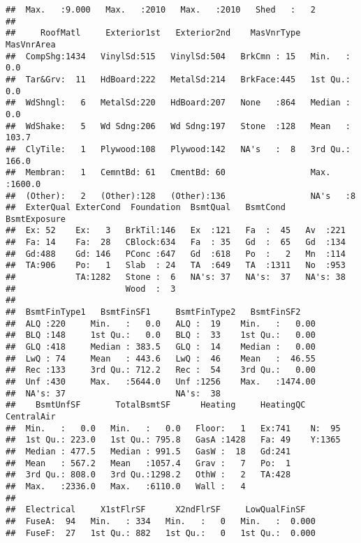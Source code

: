 \documentclass[]{article}
\begin{document}
\begin{verbatim}
##  Max.   :9.000   Max.   :2010   Max.   :2010   Shed   :   2  
##                                                              
##     RoofMatl     Exterior1st   Exterior2nd    MasVnrType    MasVnrArea    
##  CompShg:1434   VinylSd:515   VinylSd:504   BrkCmn : 15   Min.   :   0.0  
##  Tar&Grv:  11   HdBoard:222   MetalSd:214   BrkFace:445   1st Qu.:   0.0  
##  WdShngl:   6   MetalSd:220   HdBoard:207   None   :864   Median :   0.0  
##  WdShake:   5   Wd Sdng:206   Wd Sdng:197   Stone  :128   Mean   : 103.7  
##  ClyTile:   1   Plywood:108   Plywood:142   NA's   :  8   3rd Qu.: 166.0  
##  Membran:   1   CemntBd: 61   CmentBd: 60                 Max.   :1600.0  
##  (Other):   2   (Other):128   (Other):136                 NA's   :8       
##  ExterQual ExterCond  Foundation  BsmtQual   BsmtCond    BsmtExposure
##  Ex: 52    Ex:   3   BrkTil:146   Ex  :121   Fa  :  45   Av  :221    
##  Fa: 14    Fa:  28   CBlock:634   Fa  : 35   Gd  :  65   Gd  :134    
##  Gd:488    Gd: 146   PConc :647   Gd  :618   Po  :   2   Mn  :114    
##  TA:906    Po:   1   Slab  : 24   TA  :649   TA  :1311   No  :953    
##            TA:1282   Stone :  6   NA's: 37   NA's:  37   NA's: 38    
##                      Wood  :  3                                      
##                                                                      
##  BsmtFinType1   BsmtFinSF1     BsmtFinType2   BsmtFinSF2     
##  ALQ :220     Min.   :   0.0   ALQ :  19    Min.   :   0.00  
##  BLQ :148     1st Qu.:   0.0   BLQ :  33    1st Qu.:   0.00  
##  GLQ :418     Median : 383.5   GLQ :  14    Median :   0.00  
##  LwQ : 74     Mean   : 443.6   LwQ :  46    Mean   :  46.55  
##  Rec :133     3rd Qu.: 712.2   Rec :  54    3rd Qu.:   0.00  
##  Unf :430     Max.   :5644.0   Unf :1256    Max.   :1474.00  
##  NA's: 37                      NA's:  38                     
##    BsmtUnfSF       TotalBsmtSF      Heating     HeatingQC CentralAir
##  Min.   :   0.0   Min.   :   0.0   Floor:   1   Ex:741    N:  95    
##  1st Qu.: 223.0   1st Qu.: 795.8   GasA :1428   Fa: 49    Y:1365    
##  Median : 477.5   Median : 991.5   GasW :  18   Gd:241              
##  Mean   : 567.2   Mean   :1057.4   Grav :   7   Po:  1              
##  3rd Qu.: 808.0   3rd Qu.:1298.2   OthW :   2   TA:428              
##  Max.   :2336.0   Max.   :6110.0   Wall :   4                       
##                                                                     
##  Electrical     X1stFlrSF      X2ndFlrSF     LowQualFinSF    
##  FuseA:  94   Min.   : 334   Min.   :   0   Min.   :  0.000  
##  FuseF:  27   1st Qu.: 882   1st Qu.:   0   1st Qu.:  0.000  

\end{verbatim}
\end{document}
